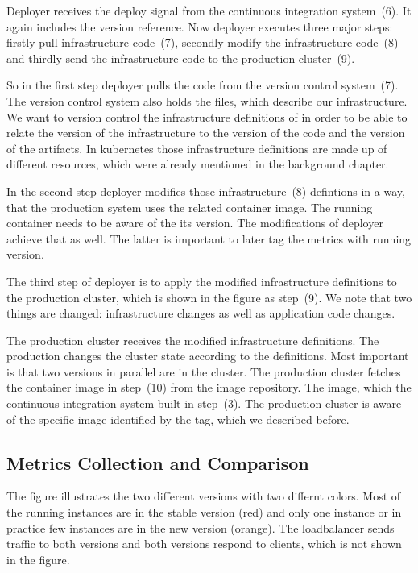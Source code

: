 Deployer receives the deploy signal from the continuous integration system~(6). It again
includes the version reference. Now deployer executes three major steps: firstly pull
infrastructure code~(7), secondly modify the infrastructure code~(8) and thirdly send the
infrastructure code to the production cluster~(9).

So in the first step deployer pulls the code from the version control system~(7). The
version control system also holds the files, which describe our infrastructure. We want to
version control the infrastructure definitions of in order to be able to relate the
version of the infrastructure to the version of the code and the version of the
artifacts. In kubernetes those infrastructure definitions are made up of different
resources, which were already mentioned in the background chapter.

In the second step deployer modifies those infrastructure~(8) defintions in a way, that
the production system uses the related container image. The running container needs to be
aware of the its version. The modifications of deployer achieve that as well. The latter
is important to later tag the metrics with running version.

The third step of deployer is to apply the modified infrastructure definitions to the
production cluster, which is shown in the figure as step~(9). We note that two things are
changed: infrastructure changes as well as application code changes.

The production cluster receives the modified infrastructure definitions. The production
changes the cluster state according to the definitions. Most important is that two
versions in parallel are in the cluster. The production cluster fetches the container
image in step~(10) from the image repository. The image, which the continuous integration
system built in step~(3). The production cluster is aware of the specific image identified
by the tag, which we described before.

\subsection{Metrics Collection and Comparison}

The figure illustrates the two different versions with two differnt colors. Most of the
running instances are in the stable version (red) and only one instance or in practice few
instances are in the new version (orange). The loadbalancer sends traffic to both versions
and both versions respond to clients, which is not shown in the figure.

